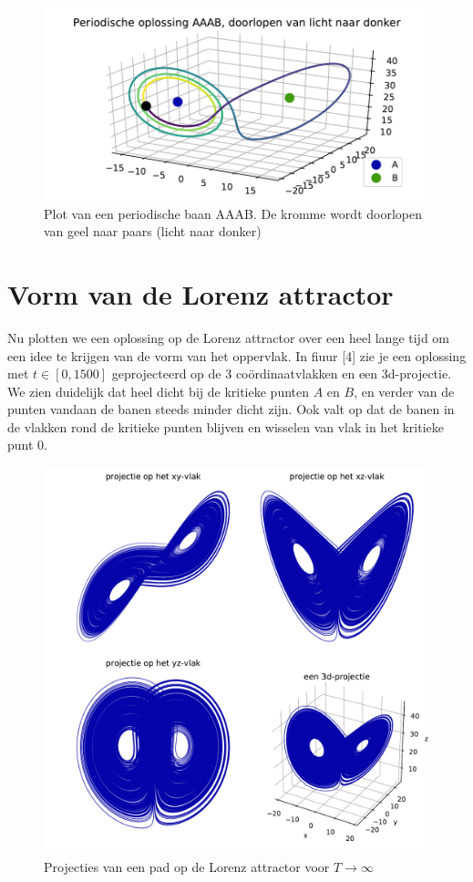 \documentclass[12pt, a4paper]{article}
\theoremstyle{definition}
\begin{document}
\begin{figure}[h]
    \centering
    \includegraphics[width=0.8\linewidth]{periodische_baan_AAAB_opdracht4.pdf}
    \caption{Plot van een periodische baan AAAB. De kromme wordt doorlopen van geel naar paars (licht naar donker)}
    \label{fig: AAAB}
\end{figure}

\section{Vorm van de Lorenz attractor}
Nu plotten we een oplossing op de Lorenz attractor over een heel lange tijd om een idee te krijgen van de vorm van het oppervlak. In fiuur [4] zie je een oplossing met $t \in [0, 1500]$ geprojecteerd op de 3 coördinaatvlakken en een 3d-projectie. We zien duidelijk dat heel dicht bij de kritieke punten $A$ en $B$, en verder van de punten vandaan de banen steeds minder dicht zijn. Ook valt op dat de banen in de vlakken rond de kritieke punten blijven en wisselen van vlak in het kritieke punt $0$.

\begin{figure}[H]
    \centering
    \includegraphics[width=0.9\linewidth]{projecties_opdracht_5.pdf}
    \caption{Projecties van een pad op de Lorenz attractor voor $T \rightarrow \infty$}
    \label{fig: projecties}
\end{figure}
\end{document}

